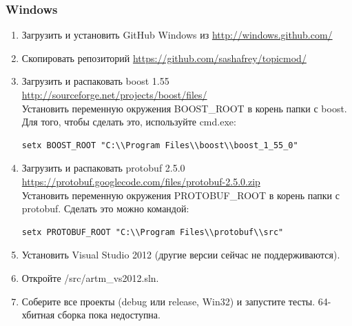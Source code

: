 \documentclass[12pt]{article}
\begin{document}
\subsubsection{Windows}

\begin{enumerate}
   \item Загрузить и установить GitHub Windows из \url{http://windows.github.com/}
   \item Скопировать репозиторий \url{https://github.com/sashafrey/topicmod/} 
   \item Загрузить и распаковать boost 1.55  \\
         \url{http://sourceforge.net/projects/boost/files/} \\
         Установить переменную окружения BOOST\_ROOT в корень папки с boost.
         Для того, чтобы сделать это, используйте cmd.exe:
\begin{verbatim}
setx BOOST_ROOT "C:\\Program Files\\boost\\boost_1_55_0"
\end{verbatim}
   \item Загрузить и распаковать protobuf 2.5.0 \\
         \url{https://protobuf.googlecode.com/files/protobuf-2.5.0.zip} \\
         Установить переменную окружения PROTOBUF\_ROOT в корень папки с protobuf. Сделать это можно командой:
\begin{verbatim}
setx PROTOBUF_ROOT "C:\\Program Files\\protobuf\\src"
\end{verbatim}
    \item Установить Visual Studio 2012 (другие версии сейчас не поддерживаются). \\
    \item Откройте /src/artm\_vs2012.sln.
    \item Соберите все проекты (debug или release, Win32) и запустите тесты. 64-хбитная сборка пока недоступна.
\end{enumerate}
\end{document}
